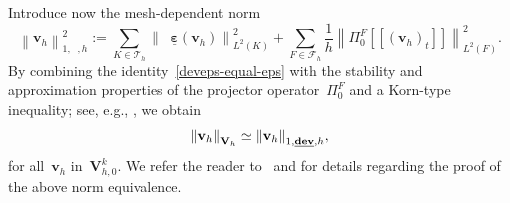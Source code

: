 \documentclass[a4paper,twoside,10pt]{article}
\theoremstyle{plain}
\theoremstyle{remark}
\theoremstyle{definition}
\numberwithin{equation}{section}
\numberwithin{figure}{section}
\newcommand{\Norm}[1]{{\left\|{#1} \right\|}}
\newcommand{\jump}[1]{\left[\!\left[#1\right]\!\right]}
\newcommand{\Tauh}{\mathcal{T}_h}
\newcommand{\K}{K}
\newcommand{\F}{F}
\newcommand{\Vh}{{\bf{V}}_h}
\newcommand{\Vhkz}{\Vbf_{h,0}^k}
\newcommand{\vbfh}{\mathbf{v}_h}
\DeclareMathOperator{\dev}{\underline{\mathbf{dev}}}
\newcommand{\tangscalar}{t}
\newcommand{\Ltwo}{L^2}
\newcommand{\Fcalh}{\mathcal{F}_h}
\newcommand{\epsbfun}{\underline{\boldsymbol{\varepsilon}}}
\newcommand{\PizF}{\Pi_0^{\F}}
\newcommand{\Vbf}{\mathbf{V}}
\begin{document}
Introduce now the mesh-dependent norm
\begin{equation*} 
\Norm{\vbfh}_{1,\dev,h}^{2} := \sum_{\K \in \Tauh} \Norm{\dev\epsbfun(\vbfh)}_{\Ltwo(\K)}^2 + \sum_{\F \in \Fcalh}\frac{1}{h}\Norm{\PizF\jump{(\vbfh)_{\tangscalar}}}_{\Ltwo(\F)}^2.
\end{equation*}
By combining 
the identity~\eqref{deveps-equal-eps}
with the stability and approximation properties of the projector operator~$\PizF$
and a Korn-type inequality; see, e.g., \cite{Brenner:2004},
we obtain
\begin{equation} \label{norm-equivalence-h-dev}
\Norm{\vbfh}_{\Vh} \simeq \Norm{\vbfh}_{1,\dev,h},
\end{equation}
for all~$\vbfh$ in~$\Vhkz$.
We refer the reader to~\cite[Lem.~6.2]{Gopalakrishnan-Lederer-Schoberl:2020} and \cite[Sect.~3.2]{Gopalakrishnan-Kogler-Lederer-Schoberl:2023}
for details regarding the proof of the above norm equivalence.
\end{document}
